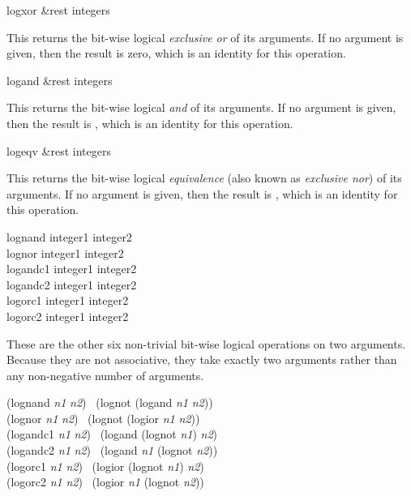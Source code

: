 \begin{defun}[Function]
logxor &rest integers

This returns the bit-wise logical \emph{exclusive or} of its arguments.
If no argument is given, then the result is zero,
which is an identity for this operation.
\end{defun}

\begin{defun}[Function]
logand &rest integers

This returns the bit-wise logical \emph{and} of its arguments.
If no argument is given, then the result is ,
which is an identity for this operation.
\end{defun}

\begin{defun}[Function]
logeqv &rest integers

This returns the bit-wise logical \emph{equivalence} (also known as \emph{exclusive nor})
of its arguments.
If no argument is given, then the result is ,
which is an identity for this operation.
\end{defun}

\begin{defun}[Function]
lognand integer1 integer2 \\
lognor integer1 integer2 \\
logandc1 integer1 integer2 \\
logandc2 integer1 integer2 \\
logorc1 integer1 integer2 \\
logorc2 integer1 integer2

These are the other six non-trivial bit-wise logical operations
on two arguments.  Because they are not associative,
they take exactly two arguments rather than any non-negative number
of arguments.
\begin{lisp}
(lognand \emph{n1} \emph{n2}) \EQ\ (lognot (logand \emph{n1} \emph{n2})) \\[2pt]
(lognor \emph{n1} \emph{n2}) \EQ\ (lognot (logior \emph{n1} \emph{n2})) \\[2pt]
(logandc1 \emph{n1} \emph{n2}) \EQ\ (logand (lognot \emph{n1}) \emph{n2}) \\[2pt]
(logandc2 \emph{n1} \emph{n2}) \EQ\ (logand \emph{n1} (lognot \emph{n2})) \\[2pt]
(logorc1 \emph{n1} \emph{n2}) \EQ\ (logior (lognot \emph{n1}) \emph{n2}) \\[2pt]
(logorc2 \emph{n1} \emph{n2}) \EQ\ (logior \emph{n1} (lognot \emph{n2}))
\end{lisp}
\end{defun}

